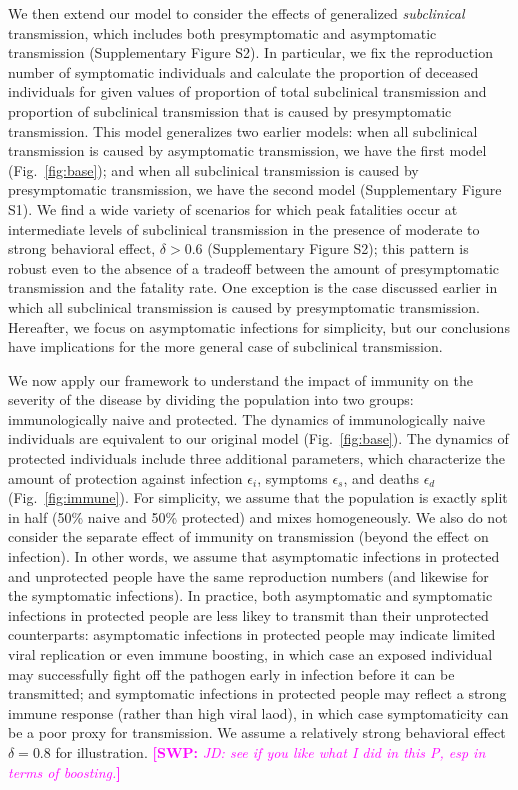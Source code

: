 \documentclass[12pt]{article}
\newcommand{\comment}{\showcomment}
\newcommand{\showcomment}[3]{\textcolor{#1}{\textbf{[#2: }\textsl{#3}\textbf{]}}}
\newcommand{\swp}[1]{\comment{magenta}{SWP}{#1}}
\newcommand{\fref}[1]{Fig.~\ref{fig:#1}}
\begin{document}
We then extend our model to consider the effects of generalized \textit{subclinical} transmission, which includes both presymptomatic and asymptomatic transmission (Supplementary Figure S2).
In particular, we fix the reproduction number of symptomatic individuals and calculate the proportion of deceased individuals for given values of proportion of total subclinical transmission and proportion of subclinical transmission that is caused by presymptomatic transmission.
This model generalizes two earlier models:
when all subclinical transmission is caused by asymptomatic transmission, we have the first model (\fref{base});
and when all subclinical transmission is caused by presymptomatic transmission, we have the second model (Supplementary Figure S1).
We find a wide variety of scenarios for which peak fatalities occur at intermediate levels of subclinical transmission in the presence of moderate to strong behavioral effect, $\delta > 0.6$ (Supplementary Figure S2);
this pattern is robust even to the absence of a tradeoff between the amount of presymptomatic transmission and the fatality rate.
One exception is the case discussed earlier in which all subclinical transmission is caused by presymptomatic transmission.
Hereafter, we focus on asymptomatic infections for simplicity, but our conclusions have implications for the more general case of subclinical transmission.

We now apply our framework to understand the impact of immunity on the severity of the disease by dividing the population into two groups: immunologically naive and protected.
The dynamics of immunologically naive individuals are equivalent to our original model (\fref{base}).
The dynamics of protected individuals include three additional parameters, which characterize the amount of protection against infection $\epsilon_i$, symptoms $\epsilon_s$, and deaths $\epsilon_d$ (\fref{immune}).
For simplicity, we assume that the population is exactly split in half (50\% naive and 50\% protected) and mixes homogeneously. We also do not consider the separate effect of immunity on transmission (beyond the effect on infection). 
In other words, we assume that asymptomatic infections in protected and unprotected people have the same reproduction numbers (and likewise for the symptomatic infections).
In practice, both asymptomatic and symptomatic infections in protected people are less likey to transmit than their unprotected counterparts: asymptomatic infections in protected people may indicate limited viral replication or even immune boosting, in which case an exposed individual may successfully fight off the pathogen early in infection before it can be transmitted; and symptomatic infections in protected people may reflect a strong immune response (rather than high viral laod), in which case symptomaticity can be a poor proxy for transmission.
We assume a relatively strong behavioral effect $\delta=0.8$ for illustration.
\swp{JD: see if you like what I did in this P, esp in terms of boosting.}
\end{document}
